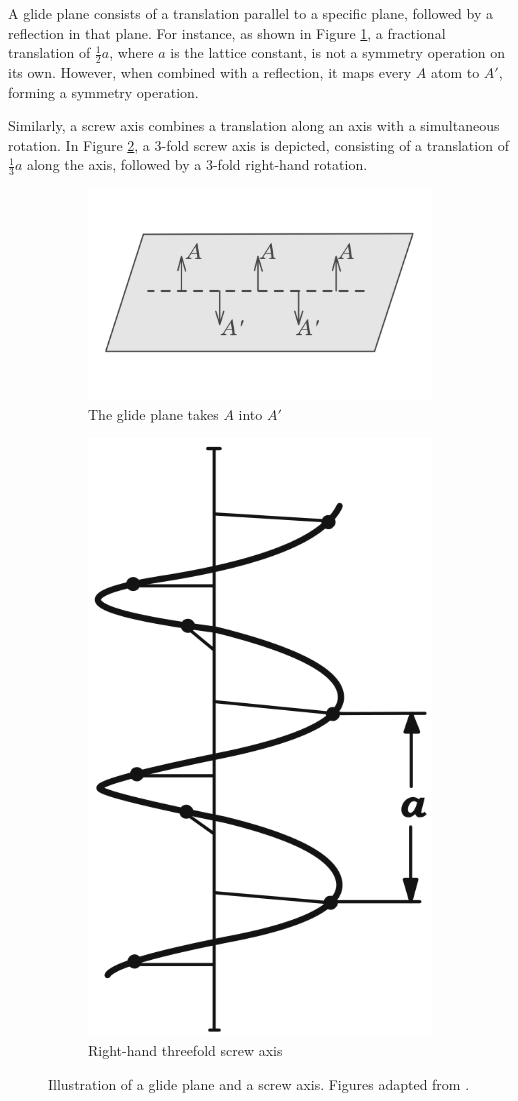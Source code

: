 A glide plane consists of a translation parallel to a specific plane, followed by a reflection in that plane. For instance, as shown in Figure \ref{fig:glideplane_screwaxis_a}, a fractional translation of \(\frac{1}{2}a\), where \(a\) is the lattice constant, is not a symmetry operation on its own. However, when combined with a reflection, it maps every \(A\) atom to \(A'\), forming a symmetry operation.

Similarly, a screw axis combines a translation along an axis with a simultaneous rotation. In Figure \ref{fig:glideplane_screwaxis_b}, a 3-fold screw axis is depicted, consisting of a translation of \(\frac{1}{3}a\) along the axis, followed by a 3-fold right-hand rotation.

\begin{figure}[H]
\centering
\begin{subfigure}{.5\textwidth}
  \centering
  \includegraphics[height=.4\linewidth]{fig/glide_plane_dresselhaus.png}
  \caption{The glide plane takes $A$ into $A'$}
  \label{fig:glideplane_screwaxis_a}
\end{subfigure}%
\begin{subfigure}{.5\textwidth}
  \centering
  \includegraphics[height=.4\linewidth]{fig/screw_axis_dresselhaus.png}
  \caption{Right-hand threefold screw axis}
  \label{fig:glideplane_screwaxis_b}
\end{subfigure}
\caption{Illustration of a glide plane and a screw axis. Figures adapted from \cite{dresselhaus}.}
\label{fig:glideplane_screwaxis}
\end{figure}

